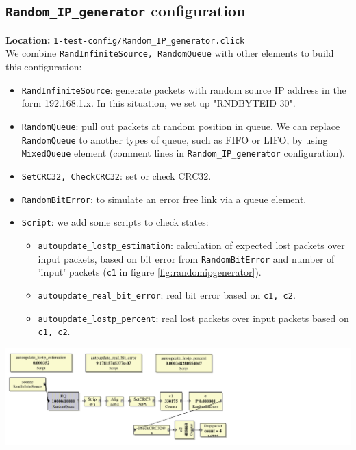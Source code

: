 \documentclass[a4paper]{article}
\begin{document}
  \subsection{\texttt{Random\_IP\_generator} configuration}
  \textbf{Location:} \texttt{1-test-config/Random\_IP\_generator.click} \\
  We combine \texttt{RandInfiniteSource, RandomQueue} with other elements to build this configuration:
  \begin{itemize}
   	\item \texttt{RandInfiniteSource}: generate packets with random source IP address in the form 192.168.1.x. In this situation, we set up "RNDBYTEID 30".
   	\item \texttt{RandomQueue}: pull out packets at random position in queue. We can replace \texttt{RandomQueue} to another types of queue, such as FIFO or LIFO, by using \texttt{MixedQueue} element (comment lines in \texttt{Random\_IP\_generator} configuration). 
   	\item \texttt{SetCRC32, CheckCRC32}: set or check CRC32.
   	\item \texttt{RandomBitError}: to simulate an error free link via a queue element.
   	\item \texttt{Script}: we add some scripts to check states: 
       	\begin{itemize}
       		\item \texttt{autoupdate\_lostp\_estimation}: calculation of expected lost packets over input packets, based on bit error from \texttt{RandomBitError} and number of 'input' packets (\texttt{c1} in figure \ref{fig:randomipgenerator}).
       		\item \texttt{autoupdate\_real\_bit\_error}: real bit error based on \texttt{c1, c2}. 
       		\item \texttt{autoupdate\_lostp\_percent}: real lost packets over input packets based on \texttt{c1, c2}.
       	\end{itemize}
   \end{itemize} 
  \begin{center}
	  \includegraphics[scale=0.55]{Random_IP_generator.pdf}
	  \label{fig:randomipgenerator}
  \end{center}
\end{document}

